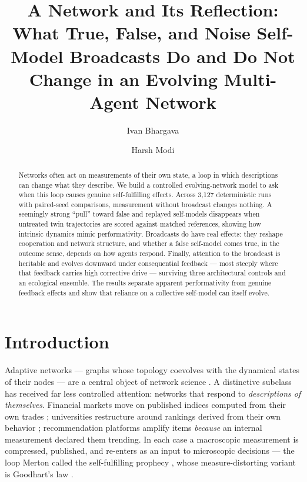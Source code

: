\documentclass{svproc}
\begin{document}
\mainmatter
\title{A Network and Its Reflection: What True, False, and Noise Self-Model Broadcasts Do and Do Not Change in an Evolving Multi-Agent Network}
\author{Ivan Bhargava \and Harsh Modi}

\maketitle

\begin{abstract}
Networks often act on measurements of their own state, a loop in which descriptions can change what they describe. We build a controlled evolving-network model to ask when this loop causes genuine self-fulfilling effects. Across 3{,}127 deterministic runs with paired-seed comparisons, measurement without broadcast changes nothing. A seemingly strong ``pull'' toward false and replayed self-models disappears when untreated twin trajectories are scored against matched references, showing how intrinsic dynamics mimic performativity. Broadcasts do have real effects: they reshape cooperation and network structure, and whether a false self-model comes true, in the outcome sense, depends on how agents respond. Finally, attention to the broadcast is heritable and evolves downward under consequential feedback --- most steeply where that feedback carries high corrective drive --- surviving three architectural controls and an ecological ensemble. The results separate apparent performativity from genuine feedback effects and show that reliance on a collective self-model can itself evolve.
\end{abstract}

\section{Introduction}
Adaptive networks --- graphs whose topology coevolves with the dynamical states
of their nodes --- are a central object of network science
\cite{gross2008adaptive,holme2012temporal}. A distinctive subclass has received
far less controlled attention: networks that respond to \emph{descriptions of
themselves}. Financial markets move on published indices computed from their
own trades \cite{soros2013fallibility}; universities restructure around
rankings derived from their own behavior \cite{espeland2007rankings};
recommendation platforms amplify items \emph{because} an internal measurement
declared them trending. In each case a macroscopic measurement is
compressed, published, and re-enters as an input to microscopic decisions ---
the loop Merton called the self-fulfilling prophecy \cite{merton1948self},
whose measure-distorting variant is Goodhart's law
\cite{strathern1997improving}.
\end{document}
